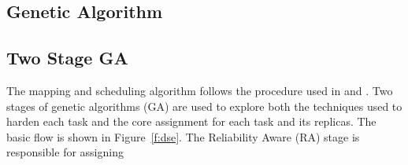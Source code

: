 \subsection{Genetic Algorithm}

\subsection{Two Stage GA}
	The mapping and scheduling algorithm follows the procedure used in \cite{bolchini2013reliability} and \cite{kang2014reliability}. Two stages of genetic algorithms (GA) are used to explore both the techniques used to harden each task and the core assignment for each task and its replicas. The basic flow is shown in Figure~\ref{f:dse}. The Reliability Aware (RA) stage is responsible for assigning 
	
	
	

